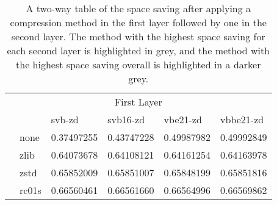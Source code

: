 \begin{table}
    \caption{\label{tab:results-layer}A two-way table of the space saving after
applying a compression method in the first layer followed by one in the second
layer. The method with the highest space saving for each second layer is
highlighted in grey, and the method with the highest space saving overall is
highlighted in a darker grey.}
    \begin{tabular}{l|l|l|l|l|l|}
\multicolumn{6}{c}{First Layer} \\
\cline{2-6}
\parbox[t]{3mm}{} &
& svb-zd & svb16-zd & vbe21-zd & vbbe21-zd \\
	    &none &0.37497255&0.43747228&0.49987982&0.49992849\\
&zlib & 0.64073678 & 0.64108121 & 0.64161254 & 0.64163978\\
&zstd & 0.65852009 & 0.65851007 & 0.65848199 & 0.65851816\\
&rc01s & 0.66560461 & 0.66561660 & 0.66564996 & 0.66569862\\
    \end{tabular}
\end{table}
